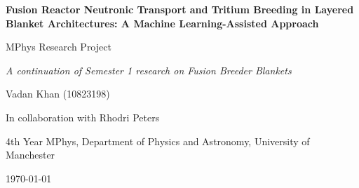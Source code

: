 \documentclass[11pt]{article}
\begin{document}
\begin{titlepage}
    \centering %

    \vspace*{2cm} %

    {\Large \bfseries Fusion Reactor Neutronic Transport and Tritium Breeding in Layered Blanket
    Architectures: A Machine Learning-Assisted Approach \par}
    \vspace{0.5em}
    {\normalsize MPhys Research Project \par}
    {\textit{A continuation of Semester 1 research on Fusion Breeder Blankets} \par} %

    \vspace{3em} %

    {\large Vadan Khan (10823198)\par} {In collaboration with Rhodri Peters \par}
    \vspace{0.5em}
    {4th Year MPhys, Department of Physics and Astronomy, University of Manchester \par}

    \vspace{2em} %

    {\large \today \par}

    \vfill %

    \begin{minipage}{1\textwidth}
    \begin{abstract}
    \normalsize
    The realisation of commercial nuclear fusion via the deuterium-tritium (D-T) fuel cycle is
    contingent upon achieving tritium production in breeder modules. Building upon our first
    homogeneous approximated studies, this study evaluates the neutronic performance of a
    heterogeneous layered breeder blanket architecture to provide a more physically realistic
    assessment, using  breeder paired with pressurised water coolant. To navigate
    the computationally intractable 8-dimensional design space of layer thicknesses, a bespoke
    Single-Objective Bayesian Optimisation pipeline employing Gaussian Process Regression (SOBO-GPR)
    was developed, integrating parametric Computer-Aided Design (CAD) generation (Paramak) with
    stochastic neutron transport (OpenMC).


\end{abstract}
\end{minipage}
\end{titlepage}
\end{document}

